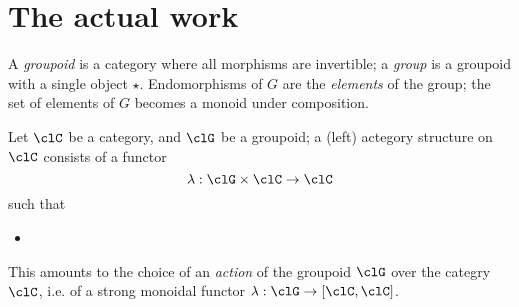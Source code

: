 

\section{The actual work}
\begin{definition}[Groupoid]
A \emph{groupoid} is a category where all morphisms are invertible; a \emph{group} is a groupoid with a single object $\star$. Endomorphisms of $G$ are the \emph{elements} of the group; the set of elements of $G$ becomes a monoid under composition.
\end{definition}
\begin{definition}[Actegory]
Let $\clC$ be a category, and $\clG$ be a groupoid; a (left) actegory structure on $\clC$ consists of a functor
\[
\lambda : \clG \times \clC \to \clC
\]
such that
\begin{itemize}
  \item
\end{itemize}
This amounts to the choice of an \emph{action} of the groupoid $\clG$ over the categry $\clC$, i.e. of a strong monoidal functor $\lambda : \clG \to [\clC,\clC]$.
\end{definition}
